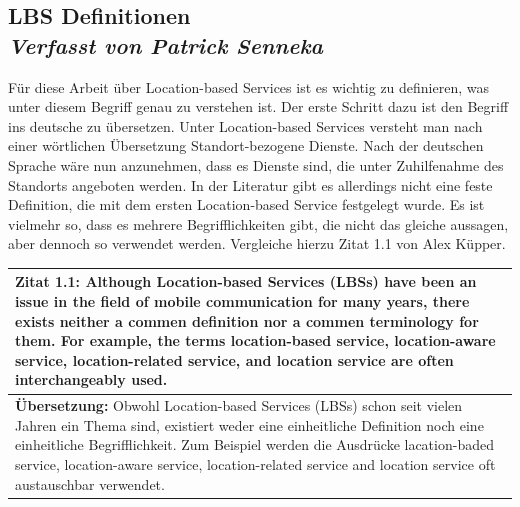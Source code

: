 \subsection[LBS Definitionen]{LBS Definitionen
 \\ \textnormal{\small{\textit {Verfasst von Patrick Senneka}}}}





Für diese Arbeit über Location-based Services ist es wichtig zu definieren, was unter diesem Begriff genau zu verstehen ist. Der erste Schritt dazu ist den Begriff ins deutsche zu übersetzen. Unter Location-based Services versteht man nach einer wörtlichen Übersetzung Standort-bezogene Dienste. Nach der deutschen Sprache wäre nun anzunehmen, dass es Dienste sind, die unter Zuhilfenahme des Standorts angeboten werden. In der Literatur gibt es allerdings nicht eine feste Definition, die mit dem ersten Location-based Service festgelegt wurde. Es ist vielmehr so, dass es mehrere Begrifflichkeiten gibt, die nicht das gleiche aussagen, aber dennoch so verwendet werden. Vergleiche hierzu Zitat 1.1 von Alex Küpper.

\begin{table}[h]
	\centering
	\begin{tabular}{|p{16cm}|}\hline
		\textbf{Zitat 1.1:} \glqq Although Location-based Services (LBSs) have been an issue in the field of mobile communication for many years, there exists neither a commen definition nor a commen terminology for them. For example, the terms location-based service, location-aware service, location-related service, and location service are often interchangeably used. \cite[S.1]{Kuepper2005} \\ \hline
		\textbf{Übersetzung:} Obwohl Location-based Services (LBSs) schon seit vielen Jahren ein Thema sind, existiert weder eine einheitliche Definition noch eine einheitliche Begrifflichkeit. Zum Beispiel werden die Ausdrücke lacation-baded service, location-aware service, location-related service and location service oft austauschbar verwendet. \\ \hline
	\end{tabular}
\end{table}


